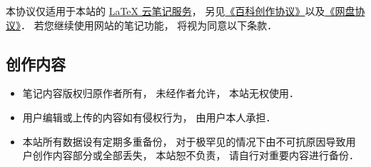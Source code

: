 
本协议仅适用于本站的 \href{http://example.com}{LaTeX 云笔记服务}， 另见\href{https://wuli.wiki/online/licens.html}{《百科创作协议》}以及\href{http://www.example.com}{《网盘协议》}． 若您继续使用网站的笔记功能， 将视为同意以下条款．

\subsection{创作内容}
\begin{itemize}
\item 笔记内容版权归原作者所有， 未经作者允许， 本站无权使用．
\item 用户编辑或上传的内容如有侵权行为， 由用户本人承担．
\item 本站所有数据设有定期多重备份， 对于极罕见的情况下由不可抗原因导致用户创作内容部分或全部丢失， 本站恕不负责， 请自行对重要内容进行备份．
\end{itemize}
